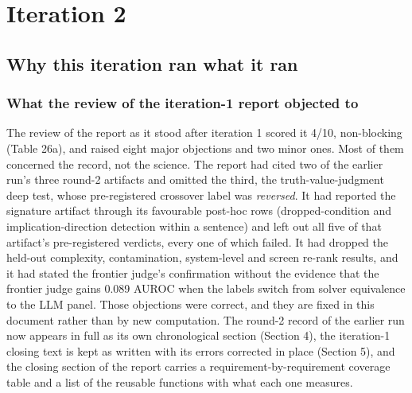 \documentclass[11pt,letterpaper]{article}
\begin{document}
\section{Iteration 2}

\subsection{Why this iteration ran what it ran}

\subsubsection{What the review of the iteration-1 report objected to}

The review of the report as it stood after iteration 1 scored it 4/10, non-blocking (Table 26a), and raised eight major objections and two minor ones. Most of them concerned the record, not the science. The report had cited two of the earlier run's three round-2 artifacts and omitted the third, the truth-value-judgment deep test, whose pre-registered crossover label was \emph{reversed}. It had reported the signature artifact through its favourable post-hoc rows (dropped-condition and implication-direction detection within a sentence) and left out all five of that artifact's pre-registered verdicts, every one of which failed. It had dropped the held-out complexity, contamination, system-level and screen re-rank results, and it had stated the frontier judge's confirmation without the evidence that the frontier judge gains 0.089 AUROC when the labels switch from solver equivalence to the LLM panel. Those objections were correct, and they are fixed in this document rather than by new computation. The round-2 record of the earlier run now appears in full as its own chronological section (Section 4), the iteration-1 closing text is kept as written with its errors corrected in place (Section 5), and the closing section of the report carries a requirement-by-requirement coverage table and a list of the reusable functions with what each one measures.
\end{document}
